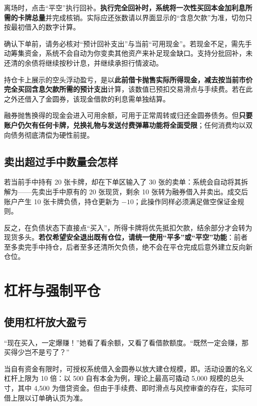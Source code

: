 \documentclass[11pt,a4paper,twoside]{article}
\newcommand{\gold}{金圆券}
\begin{document}
离场时，点击“平空”执行回补。\textbf{执行完全回补时，系统将一次性买回本金加利息所需的卡牌总量}并完成核销。实际应还张数请以界面显示的“含息欠款”为准，切勿只按最初借入的数字计算。

确认下单前，请务必核对“预计回补支出”与当前“可用现金”。若现金不足，需先手动筹集资金，系统不会自动为你变卖其他资产来补足现金缺口。支持分批回补，未还清的余债将继续按秒计息，并继续承担行情波动。

持仓卡上展示的空头浮动盈亏，是以\textbf{此前借卡抛售实际所得现金，减去按当前市价完全买回含息欠款所需的预计支出}计算，该数值已预扣交易滑点与手续费。若在此之外还借入了金圆券，该现金借款的利息需单独结算。

融券抛售换得的现金会进入可用余额，可用于正常周转或归还金圆券债务。但\textbf{只要账户仍欠有任何卡牌，兑换礼物与发送付费弹幕功能将全面受限}；任何消费均以双向债务彻底清偿为硬性前提。

\subsection{卖出超过手中数量会怎样}

若当前手中持有 20 张卡牌，却在下单区输入了 30 张的卖单：系统会自动将其拆解为——先卖出手中原有的 20 张现货，剩余 10 张转为融券借入并卖出。成交后账户产生 10 张卡牌负债，持仓更新为 $-10$；此操作同样必须满足做空保证金规则。

反之，在负债状态下直接点“买入”，所得卡牌将优先抵扣欠款，结余部分才会转为现货多头。\textbf{若仅希望安全退出既有仓位，请统一使用“平多”或“平空”功能}：前者至多卖完手中持仓，后者至多还清所欠负债，绝不会在平仓完成后意外建立反向新仓位。

\section{杠杆与强制平仓}

\subsection{使用杠杆放大盈亏}

\begin{lorebox}
“现在买入，一定爆赚！”她看了看余额，又看了看借款额度。“既然一定会赚，那买得少岂不是亏了？”
\end{lorebox}

当自有资金有限时，可授权系统借入\gold{}以放大建仓规模，即。活动设置的名义杠杆上限为 10 倍：以 500 自有本金为例，理论上最高可撬动 5,000 规模的总头寸，其中 4,500 为借贷资金。但由于手续费、即时滑点与风控审查的存在，实际可借上限以订单确认页为准。
\end{document}
